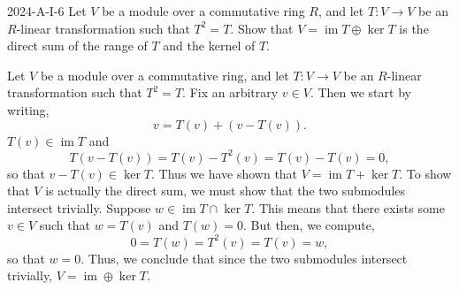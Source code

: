\documentclass{article}
\begin{document}
	\begin{prb}{2024-A-I-6}
		Let $V$ be a module over a commutative ring $R$, and let $T: V \to V$ be an $R$-linear transformation such that $T^2 = T$. Show that $V = \operatorname{im}{T}\oplus \operatorname{ker}{T}$ is the direct sum of the range of $T$ and the kernel of $T$. 
	\end{prb} 
	Let $V$ be a module over a commutative ring, and let $T: V \to V$ be an $R$-linear transformation such that $T^2 = T$. Fix an arbitrary $v \in V$. Then we start by writing, 
	\begin{equation*}
		v = T(v) + (v - T(v)). 
	\end{equation*}
	$T(v) \in \operatorname{im}{T}$ and 
	\begin{equation*}
		T(v - T(v)) = T(v) - T^{2}(v) = T(v) - T(v) =0, 
	\end{equation*}
	so that $v - T(v) \in \operatorname{ker}{T}$. Thus we have shown that $V = \operatorname{im}{T} + \operatorname{ker}{T}$. To show that $V$ is actually the direct sum, we must show that the two submodules intersect trivially. Suppose $w \in \operatorname{im}{T} \cap \ker{T}$. This means that there exists some $v \in V$ such that $w = T(v)$ and $T(w) = 0$. But then, we compute, 
	\begin{equation*}
		0 = T(w) = T^2(v) = T(v) = w, 
	\end{equation*}
	so that $w = 0$. Thus, we conclude that since the two submodules intersect trivially, $V = \operatorname{im} \oplus \ker{T}$. 
	
\end{document}
